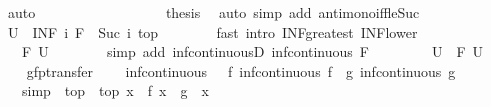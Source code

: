 \begin{isabellebody}
\ auto\isanewline
\ \ \ \ \ \ \ \ \isamarkupfalse%
\ \isacommand{{\isacharbraceright}}\isamarkupfalse%
\isanewline
\ \ \ \ \ \ \isamarkupfalse%
\ {\isacharquery}thesis\ \isamarkupfalse%
\ {\isacharparenleft}auto\ simp\ add{\isacharcolon}\ antimono{\isacharunderscore}iff{\isacharunderscore}le{\isacharunderscore}Suc{\isacharparenright}\isanewline
\ \ \ \ \isamarkupfalse%
\isanewline
\ \ \ \ \isamarkupfalse%
\ {\isachardoublequoteopen}{\isacharquery}U\ {\isasymle}\ {\isacharparenleft}INF\ i{\isachardot}\ {\isacharparenleft}F\ {\isacharcircum}{\isacharcircum}\ Suc\ i{\isacharparenright}\ top{\isacharparenright}{\isachardoublequoteclose}\isanewline
\ \ \ \ \ \ \isamarkupfalse%
\ {\isacharparenleft}fast\ intro{\isacharcolon}\ INF{\isacharunderscore}greatest\ INF{\isacharunderscore}lower{\isacharparenright}\isanewline
\ \ \ \ \isamarkupfalse%
\ \isamarkupfalse%
\ {\isachardoublequoteopen}{\isasymdots}\ {\isasymle}\ F\ {\isacharquery}U{\isachardoublequoteclose}\isanewline
\ \ \ \ \ \ \isamarkupfalse%
\ {\isacharparenleft}simp\ add{\isacharcolon}\ inf{\isacharunderscore}continuousD\ {\isacartoucheopen}inf{\isacharunderscore}continuous\ F{\isacartoucheclose}\ {\isacharasterisk}{\isacharparenright}\isanewline
\ \ \ \ \isamarkupfalse%
\ \isamarkupfalse%
\ {\isachardoublequoteopen}{\isacharquery}U\ {\isasymle}\ F\ {\isacharquery}U{\isachardoublequoteclose}\ \isacommand{{\isachardot}}\isamarkupfalse%
\isanewline
\ \ \isamarkupfalse%
\isanewline
{}\isamarkupfalse%
%
\endisatagproof
{\isafoldproof}%
%
\isadelimproof
\isanewline
%
\endisadelimproof
\isanewline
{}\isamarkupfalse%
\ gfp{\isacharunderscore}transfer{\isacharcolon}\isanewline
\ \ \ {\isasymalpha}{\isacharcolon}\ {\isachardoublequoteopen}inf{\isacharunderscore}continuous\ {\isasymalpha}{\isachardoublequoteclose}\ \ f{\isacharcolon}\ {\isachardoublequoteopen}inf{\isacharunderscore}continuous\ f{\isachardoublequoteclose}\ \ g{\isacharcolon}\ {\isachardoublequoteopen}inf{\isacharunderscore}continuous\ g{\isachardoublequoteclose}\isanewline
\ \ \ {\isacharbrackleft}simp{\isacharbrackright}{\isacharcolon}\ {\isachardoublequoteopen}{\isasymalpha}\ top\ {\isacharequal}\ top{\isachardoublequoteclose}\ {\isachardoublequoteopen}{\isasymAnd}x{\isachardot}\ {\isasymalpha}\ {\isacharparenleft}f\ x{\isacharparenright}\ {\isacharequal}\ g\ {\isacharparenleft}{\isasymalpha}\ x{\isacharparenright}{\isachardoublequoteclose}\isanewline

\end{isabellebody}
